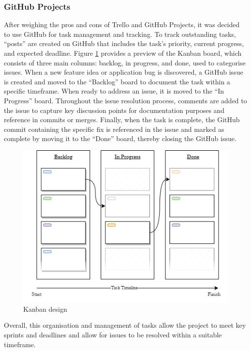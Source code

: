 \documentclass[11pt]{article}
\begin{document}
\subsubsection{GitHub Projects}
After weighing the pros and cons of Trello and GitHub Projects, it was decided
to use GitHub for task management and tracking. To track outstanding tasks,
``posts'' are created on GitHub that includes the task's priority, current
progress, and expected deadline. Figure \ref{fig:kanban_design} provides a
preview of the Kanban board, which consists of three main columns: backlog, in
progress, and done, used to categorise issues. When a new feature idea or
application bug is discovered, a GitHub issue is created and moved to the
``Backlog'' board to document the task within a specific timeframe. When ready to
address an issue, it is moved to the ``In Progress'' board. Throughout the issue
resolution process, comments are added to the issue to capture key discussion
points for documentation purposes and reference in commits or merges. Finally,
when the task is complete, the GitHub commit containing the specific fix is
referenced in the issue and marked as complete by moving it to the ``Done'' board,
thereby closing the GitHub issue.
\begin{figure}[H]
  \centering
  \includegraphics[width=\textwidth]{images/kanban_design.png}
  \caption{Kanban design}
  \label{fig:kanban_design}
\end{figure}

Overall, this organisation and management of tasks allow the project to meet key
sprints and deadlines and allow for issues to be resolved within a suitable
timeframe.
\end{document}
